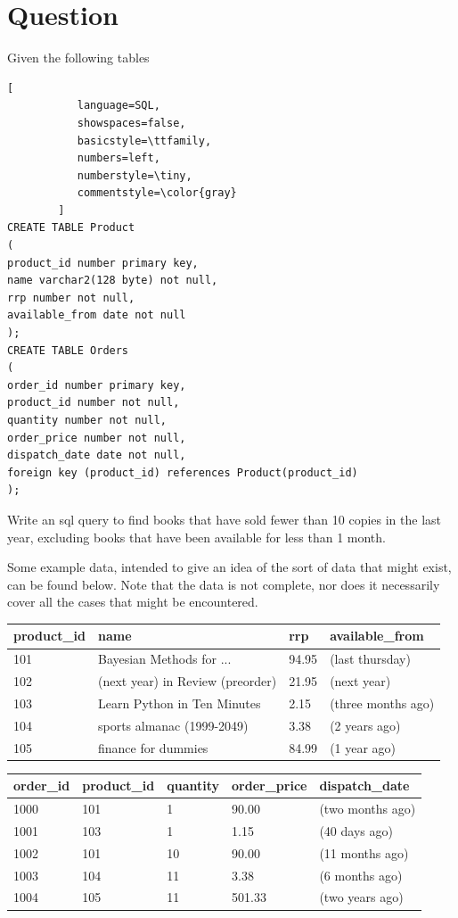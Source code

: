 \documentclass[12pt,a4paper,article]{memoir} %
\begin{document}
\section{Question}
Given the following tables
\begin{lstlisting}[
           language=SQL,
           showspaces=false,
           basicstyle=\ttfamily,
           numbers=left,
           numberstyle=\tiny,
           commentstyle=\color{gray}
        ]
CREATE TABLE Product
(
product_id number primary key,
name varchar2(128 byte) not null,
rrp number not null,
available_from date not null
);
CREATE TABLE Orders
(
order_id number primary key,
product_id number not null,
quantity number not null,
order_price number not null,
dispatch_date date not null,
foreign key (product_id) references Product(product_id)
);
\end{lstlisting}
Write an sql query to find books that have sold fewer than 10 copies in the last year, 
excluding books that have been available for less than 1 month.

Some example data, intended to give an idea of the sort of data that might exist, 
can be found below. Note that the data is not complete, 
nor does it necessarily cover all the cases that might be encountered.

\begin{center}
    \begin{tabular}{| l | l | l | l |}
    \hline
	product\_id & name & rrp & available\_from \\
	\hline 
	101 & Bayesian Methods for ...& 94.95 & (last thursday) \\
	102 & (next year) in Review (preorder) & 21.95 & (next year) \\
	103 & Learn Python in Ten Minutes & 2.15 & (three months ago) \\
	104 & sports almanac (1999-2049) & 3.38 & (2 years ago) \\
	105 & finance for dummies & 84.99 & (1 year ago)  \\
	\hline
    \end{tabular}
\end{center}
\begin{center}
    \begin{tabular}{| l | l | l | l | l |}
    \hline
	order\_id & product\_id & quantity & order\_price & dispatch\_date \\
	\hline 
	1000 & 101 & 1 & 90.00 & (two months ago) \\
	1001 & 103 & 1 & 1.15 & (40 days ago) \\
	1002 & 101 & 10 & 90.00 & (11 months ago) \\
	1003 & 104 & 11 & 3.38 & (6 months ago) \\
	1004 & 105 & 11 & 501.33 & (two years ago) \\
	\hline
    \end{tabular}
\end{center}
\end{document}
